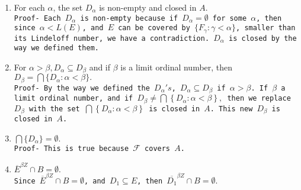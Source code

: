 \documentclass{article}
\begin{document}
\begin{enumerate}
\item For each $  \alpha  $, the set $ D_\alpha  $ is non-empty and closed in $A$.\\
\texttt{Proof- Each $D_\alpha$ is non-empty because if $D_\alpha=\emptyset$ for some $\alpha$, then since $\alpha<L(E)$, and $E$ can be covered by $\{F_\gamma: \gamma<\alpha\}$, smaller than its Lindeloff number, we have a contradiction. $D_\alpha$ is closed by the way we defined them.}

\item For $ \alpha>\beta, D_\alpha \subseteq D_\beta  $ and if $  \beta $ is a limit ordinal number, then\\$  D_\beta=\bigcap \{D_\alpha:\alpha <\beta\}.$\\
\texttt{Proof- By the way we defined the $D_\alpha's$, $D_\alpha\subseteq D_\beta$ if $\alpha>\beta$. If $\beta$ a limit ordinal number, and 
if $D_\beta \neq \bigcap\left\{D_\alpha:\alpha<\beta\right\}, $ then we replace $D_\beta$ with the set $\bigcap\left\{D_\alpha:\alpha<\beta\right\}$ is closed in $A$. This new $D_\beta$ is closed in $A$.}

\item $ \bigcap\{D_\alpha\}=\emptyset . $\\
\texttt{Proof- This is true because $\mathcal{F}$ covers $A$.}


\item $\overline{E}^{\beta Z} \cap B =\emptyset.$\\
\texttt{Since $\overline{E}^{\beta Z} \cap B=\emptyset$, and $D_1\subseteq E$, then $\overline{D_1}^{\beta Z}\cap B=\emptyset.$}
 
\end{enumerate}
\end{document}
